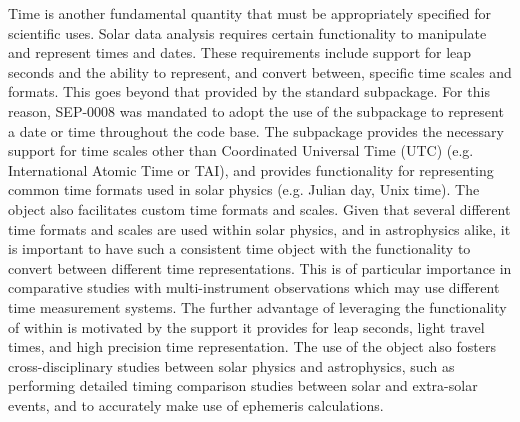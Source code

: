 Time is another fundamental quantity that must be appropriately specified for scientific uses.
Solar data analysis requires certain functionality to manipulate and represent times and dates.
These requirements include support for leap seconds and the ability to represent, and convert between, specific time scales and formats.
This goes beyond that provided by the standard \python {} subpackage.
For this reason, SEP-0008 \citep{sep-0008} was mandated to adopt the use of the  subpackage to represent a date or time throughout the \sunpypkg code base.
The  subpackage provides the necessary support for time scales other than Coordinated Universal Time (UTC) (e.g. International Atomic Time or TAI), and provides functionality for representing common time formats used in solar physics (e.g. Julian day, Unix time). The  object also facilitates custom time formats and scales.
Given that several different time formats and scales are used within solar physics, and in astrophysics alike, it is important to have such a consistent time object with the functionality to convert between different time representations.
This is of particular importance in comparative studies with multi-instrument observations which may use different time measurement systems.
The further advantage of leveraging the functionality of  within \sunpypkg is motivated by the support it provides for leap seconds, light travel times, and high precision time representation.
The use of the  object also fosters cross-disciplinary studies between solar physics and astrophysics, such as performing detailed timing comparison studies between solar and extra-solar events, and to accurately make use of ephemeris calculations.
